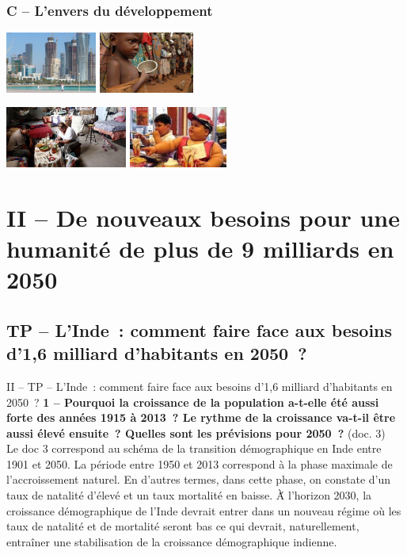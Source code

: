 \documentclass[C]{beamer}
\begin{document}
	\begin{frame}
	\frametitle{C -- L'envers du développement}
	\begin{center}
	\includegraphics[height=2cm]{images/carte_1_06.jpg}
	\includegraphics[height=2cm]{images/carte_1_07.jpg}
	\end{center}
	\begin{center}
	\includegraphics[height=2cm]{images/carte_1_08.jpg}
	\includegraphics[height=2cm]{images/carte_1_09.jpg}
	\end{center}
	\end{frame}

	\section*{II -- De nouveaux besoins pour une humanité de plus de 9 milliards en 2050}
	\subsection*{TP -- L'Inde~: comment faire face aux besoins d'1,6 milliard d'habitants en 2050~?}
	\begin{frame}{II -- TP -- L'Inde~: comment faire face aux besoins d'1,6 milliard d'habitants en 2050~?}
	\textbf{1 -- Pourquoi la croissance de la population a-t-elle été aussi forte des années 1915 à 2013~? Le rythme de la croissance va-t-il \^etre aussi élevé ensuite~? Quelles sont les prévisions pour 2050~?} (doc. 3)\\
\pause
Le doc 3 correspond au schéma de la transition démographique en Inde entre 1901 et 2050. La période entre 1950 et 2013 correspond à la phase maximale de l'accroissement naturel. En d'autres termes, dans cette phase, on constate d'un taux de natalité d'élevé et un taux mortalité en baisse. \'À l'horizon 2030, la croissance démographique de l'Inde devrait entrer dans un nouveau régime où les taux de natalité et de mortalité seront bas ce qui devrait, naturellement, entraîner une stabilisation de la croissance démographique indienne.
	\end{frame}
	
\end{document}
